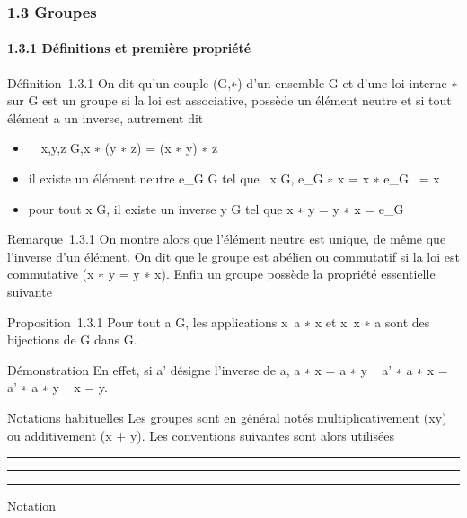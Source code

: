 
\subsubsection{1.3 Groupes}

\paragraph{1.3.1 Définitions et première propriété}

Définition~1.3.1 On dit qu'un couple (G,∗) d'un ensemble G et d'une loi
interne ∗ sur G est un groupe si la loi est associative, possède un
élément neutre et si tout élément a un inverse, autrement dit

\begin{itemize}
\itemsep1pt\parskip0pt
\item
  \forall~~x,y,z \in G,x ∗ (y ∗ z) = (x ∗ y) ∗ z
\item
  il existe un élément neutre e_G \in G tel que
  \forall~x \in G, e_G ∗ x = x ∗ e_G~
  = x
\item
  pour tout x \in G, il existe un inverse y \in G tel que x ∗ y = y ∗ x =
  e_G
\end{itemize}

Remarque~1.3.1 On montre alors que l'élément neutre est unique, de même
que l'inverse d'un élément. On dit que le groupe est abélien ou
commutatif si la loi est commutative (x ∗ y = y ∗ x). Enfin un groupe
possède la propriété essentielle suivante

Proposition~1.3.1 Pour tout a \in G, les applications
x\mapsto~a ∗ x et x\mathrel\mapsto~x ∗ a
sont des bijections de G dans G.

Démonstration En effet, si a' désigne l'inverse de a, a ∗ x = a ∗ y \rigtharrow~ a'
∗ a ∗ x = a' ∗ a ∗ y \rigtharrow~ x = y.

Notations habituelles Les groupes sont en général notés
multiplicativement (xy) ou additivement (x + y). Les conventions
suivantes sont alors utilisées

\begin{center}\rule{3in}{0.4pt}\end{center}

\begin{center}\rule{3in}{0.4pt}\end{center}

\begin{center}\rule{3in}{0.4pt}\end{center}

Notation

